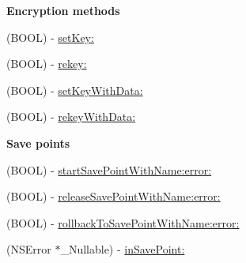 \begin{Indent}\textbf{ Encryption methods}\par
{\em 

 

 }\begin{DoxyCompactItemize}
\item 
(B\+O\+OL) -\/ \mbox{\hyperlink{interface_o_p_t_l_y_f_m_d_b_database_a2b567d61e78a76a365b37df2f8d65bf7}{set\+Key\+:}}
\item 
(B\+O\+OL) -\/ \mbox{\hyperlink{interface_o_p_t_l_y_f_m_d_b_database_af64a2ede2ac7642bada99f4ba1d905f2}{rekey\+:}}
\item 
(B\+O\+OL) -\/ \mbox{\hyperlink{interface_o_p_t_l_y_f_m_d_b_database_a7cbf561f5cbeae819eefdc0b873f1730}{set\+Key\+With\+Data\+:}}
\item 
(B\+O\+OL) -\/ \mbox{\hyperlink{interface_o_p_t_l_y_f_m_d_b_database_ae1454ed91642c4d127fd36f370f04d8c}{rekey\+With\+Data\+:}}
\end{DoxyCompactItemize}
\end{Indent}
\begin{Indent}\textbf{ Save points}\par
{\em 

 

 }\begin{DoxyCompactItemize}
\item 
(B\+O\+OL) -\/ \mbox{\hyperlink{interface_o_p_t_l_y_f_m_d_b_database_a394534a47e9f054edfc63021f2a1ebc3}{start\+Save\+Point\+With\+Name\+:error\+:}}
\item 
(B\+O\+OL) -\/ \mbox{\hyperlink{interface_o_p_t_l_y_f_m_d_b_database_afb6f13df41c3e8e1813a00f6d1ec0428}{release\+Save\+Point\+With\+Name\+:error\+:}}
\item 
(B\+O\+OL) -\/ \mbox{\hyperlink{interface_o_p_t_l_y_f_m_d_b_database_a8ae3bd5f48fed1f09b14328fc777dab5}{rollback\+To\+Save\+Point\+With\+Name\+:error\+:}}
\item 
(N\+S\+Error $\ast$\+\_\+\+Nullable) -\/ \mbox{\hyperlink{interface_o_p_t_l_y_f_m_d_b_database_a5ced1981fdf00e7f6609195c0255e71d}{in\+Save\+Point\+:}}
\end{DoxyCompactItemize}
\end{Indent}
